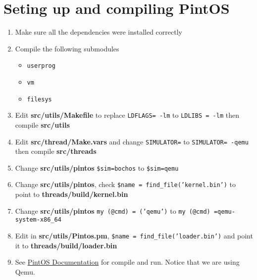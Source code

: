 \documentclass[12pt]{article}
\begin{document}
\section{Seting up and compiling PintOS}
\begin{enumerate}
	\item Make sure all the dependencies were installed correctly
	\item Compile the following submodules
	\begin{itemize}
		\item \texttt{userprog}
		\item \texttt{vm}
		\item \texttt{filesys}
	\end{itemize}
	\item Edit \textbf{src/utils/Makefile} to replace \texttt{LDFLAGS= -lm} to \texttt{LDLIBS = -lm} then compile \textbf{src/utils}
	\item Edit  \textbf{src/thread/Make.vars} and change \texttt{SIMULATOR=} to \texttt{SIMULATOR= -qemu} then compile \textbf{src/threads}
	\item Change \textbf{src/utils/pintos} \texttt{\$sim=bochos} to \texttt{\$sim=qemu}
	\item Change \textbf{src/utils/pintos}, check \texttt{\$name = find\_file('kernel.bin')} to point to \textbf{threads/build/kernel.bin}
	\item  Change \textbf{src/utils/pintos} \texttt{my (@cmd) = ('qemu')} to \texttt{my (@cmd) =qemu-system-x86\_64}
	\item Edit in \textbf{src/utils/Pintos.pm}, \texttt{\$name = find\_file('loader.bin')} and point it to \textbf{threads/build/loader.bin}
	\item See \href{https://web.stanford.edu/class/cs140/projects/pintos/pintos_1.html#SEC4}{PintOS Documentation} for compile and run. Notice that we are using Qemu.
\end{enumerate}
\end{document}
